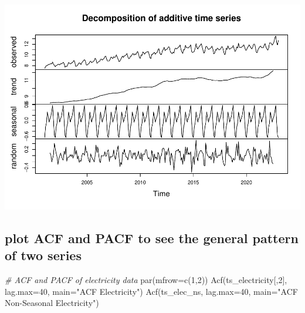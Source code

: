\documentclass[
]{article}
\newenvironment{Shaded}{\begin{snugshade}}{\end{snugshade}}
\newcommand{\AttributeTok}[1]{\textcolor[rgb]{0.77,0.63,0.00}{#1}}
\newcommand{\CommentTok}[1]{\textcolor[rgb]{0.56,0.35,0.01}{\textit{#1}}}
\newcommand{\DecValTok}[1]{\textcolor[rgb]{0.00,0.00,0.81}{#1}}
\newcommand{\FunctionTok}[1]{\textcolor[rgb]{0.00,0.00,0.00}{#1}}
\newcommand{\NormalTok}[1]{#1}
\newcommand{\OtherTok}[1]{\textcolor[rgb]{0.56,0.35,0.01}{#1}}
\newcommand{\SpecialCharTok}[1]{\textcolor[rgb]{0.00,0.00,0.00}{#1}}
\newcommand{\StringTok}[1]{\textcolor[rgb]{0.31,0.60,0.02}{#1}}
\begin{document}
\includegraphics{Final-Project_files/figure-latex/unnamed-chunk-5-2.pdf}

\begin{Shaded}
\end{Shaded}

\hypertarget{plot-acf-and-pacf-to-see-the-general-pattern-of-two-series}{%
\subsection{plot ACF and PACF to see the general pattern of two
series}\label{plot-acf-and-pacf-to-see-the-general-pattern-of-two-series}}

\begin{Shaded}
\begin{Highlighting}[]
\CommentTok{\# ACF and PACF of electricity data}
\FunctionTok{par}\NormalTok{(}\AttributeTok{mfrow=}\FunctionTok{c}\NormalTok{(}\DecValTok{1}\NormalTok{,}\DecValTok{2}\NormalTok{))}
\FunctionTok{Acf}\NormalTok{(ts\_electricity[,}\DecValTok{2}\NormalTok{], }\AttributeTok{lag.max=}\DecValTok{40}\NormalTok{, }\AttributeTok{main=}\StringTok{"ACF Electricity"}\NormalTok{)}
\FunctionTok{Acf}\NormalTok{(ts\_elec\_ns, }\AttributeTok{lag.max=}\DecValTok{40}\NormalTok{, }\AttributeTok{main=}\StringTok{"ACF Non{-}Seasonal Electricity"}\NormalTok{)}
\end{Highlighting}
\end{Shaded}
\end{document}
